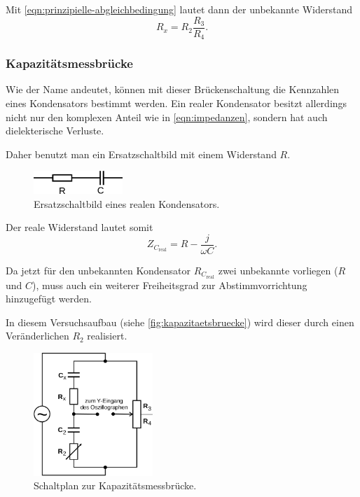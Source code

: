 Mit \autoref{eqn:prinzipielle-abgleichbedingung} lautet dann der unbekannte Widerstand
\begin{equation}
	R_x = R_2 \frac{R_3}{R_4}.
	\label{eqn:wheatstone-rx}
\end{equation}

\subsubsection{Kapazitätsmessbrücke}
\label{sec:theorie-kapazitaetsmessbruecke}

Wie der Name andeutet, können mit dieser Brückenschaltung die Kennzahlen eines Kondensators bestimmt werden.
Ein realer Kondensator besitzt allerdings nicht nur den komplexen Anteil wie in \autoref{eqn:impedanzen},
sondern hat auch dielekterische Verluste.

Daher benutzt man ein Ersatzschaltbild mit einem Widerstand $R$.
\begin{figure}[H]
	\centering
	\includegraphics[width=0.3\textwidth]{bilder/ersatz-kapazitaet.png}
	\caption{Ersatzschaltbild eines realen Kondensators.}
	\label{fig:ersatz-kondensator}
\end{figure}
Der reale Widerstand lautet somit
\begin{equation}
	Z_{C_\text{real}} = R - \frac{j}{\omega C}.
	\label{eqn:realer-wderstand-kondensator}
\end{equation}

Da jetzt für den unbekannten Kondensator $R_{C_\text{real}}$ zwei unbekannte vorliegen ($R$ und $C$), muss 
auch ein weiterer Freiheitsgrad zur Abstimmvorrichtung hinzugefügt werden.

In diesem Versuchsaufbau (siehe \autoref{fig:kapazitaetsbruecke}) wird dieser durch einen Veränderlichen $R_2$
realisiert.
\begin{figure}[H]
	\centering
	\includegraphics[width=0.4\textwidth]{bilder/kapazitaetsbruecke.png}
	\caption{Schaltplan zur Kapazitätsmessbrücke.}
	\label{fig:kapazitaetsbruecke}
\end{figure}


